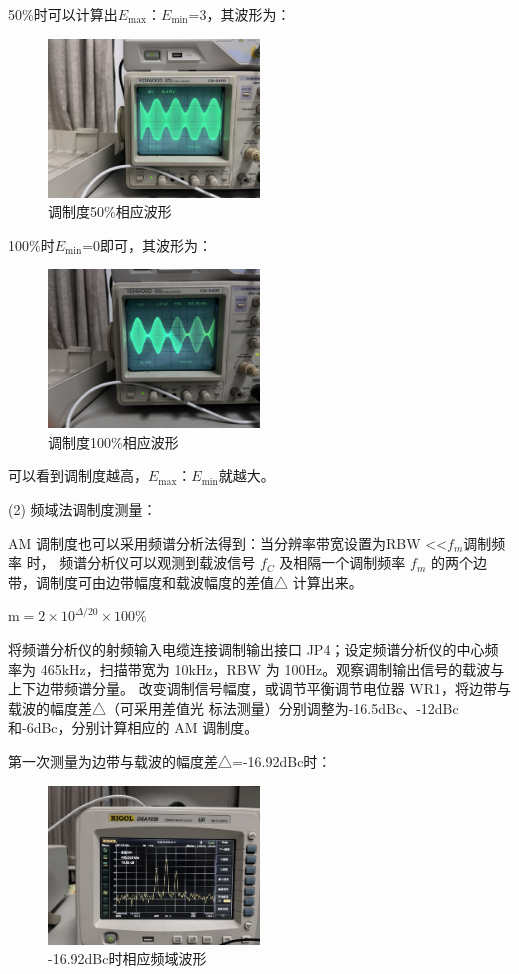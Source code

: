 \documentclass{../source/Experiment}
\begin{document}
50\%时可以计算出$E_{\max }：E_{\min }$=3，其波形为：
\begin{figure}[H]
    \centering
    \includegraphics[width = 0.5\textwidth]{lab6/7.png}
    \caption{调制度50\%相应波形}
\end{figure}

100\%时$E_{\min }$=0即可，其波形为：
\begin{figure}[H]
    \centering
    \includegraphics[width = 0.5\textwidth]{lab6/8.png}
    \caption{调制度100\%相应波形}
\end{figure}

可以看到调制度越高，$E_{\max }：E_{\min }$就越大。

(2) 频域法调制度测量：

AM 调制度也可以采用频谱分析法得到：当分辨率带宽设置为RBW <<$f_m$调制频率
时，
频谱分析仪可以观测到载波信号
$f_C$ 及相隔一个调制频率
$f_m$
的两个边带，调制度可由边带幅度和载波幅度的差值△
计算出来。

$\mathrm{m}=2 \times 10^{\Delta / 20} \times 100 \%$

将频谱分析仪的射频输入电缆连接调制输出接口 JP4；设定频谱分析仪的中心频率为
465kHz，扫描带宽为 10kHz，RBW 为 100Hz。观察调制输出信号的载波与上下边带频谱分量。
改变调制信号幅度，或调节平衡调节电位器 WR1，将边带与载波的幅度差△（可采用差值光
标法测量）分别调整为-16.5dBc、-12dBc 和-6dBc，分别计算相应的 AM 调制度。

第一次测量为边带与载波的幅度差△=-16.92dBc时：
\begin{figure}[H]
    \centering
    \includegraphics[width = 0.5\textwidth]{lab6/1.jpg}
    \caption{-16.92dBc时相应频域波形}
\end{figure}
\end{document}
